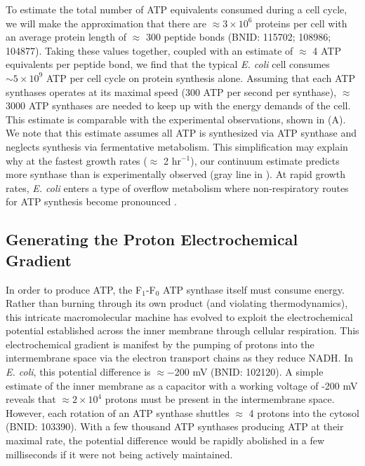 To estimate the total number of ATP equivalents consumed during a cell cycle, we
will make the approximation that there are $\approx 3\times10^6$ proteins per
cell with an average protein length of $\approx$ 300 peptide bonds (BNID:
115702; 108986; 104877). Taking these values together, coupled with an estimate
of $\approx$ 4 ATP equivalents per peptide bond, we find that the typical
\textit{E. coli} cell consumes $\sim 5 \times 10^9$ ATP per cell cycle on
protein synthesis alone. Assuming that each ATP synthases operates at its
maximal speed (300 ATP per second per synthase), $\approx$ 3000 ATP synthases
are needed to keep up with the energy demands of the cell. This estimate
is comparable with the experimental observations,  shown in
 (A). We note that this estimate assumes all ATP is
synthesized via ATP synthase and neglects synthesis via fermentative metabolism.
This simplification may explain why at the fastest growth rates ($\approx$ 2
hr$^{-1}$), our continuum estimate predicts more synthase than is experimentally
observed (gray line in ). At rapid growth rates,
\textit{E. coli} enters a type of overflow metabolism where non-respiratory 
routes for ATP synthesis become pronounced \citep{molenaar2009, zhuang2011, szenk2017}.

\subsection{Generating the Proton Electrochemical Gradient}
In order to produce ATP, the F$_1$-F$_0$ ATP synthase itself must consume
energy. Rather than burning through its own product (and violating
thermodynamics), this intricate macromolecular machine has evolved to exploit
the electrochemical potential established across the inner membrane through
cellular respiration. This electrochemical gradient is manifest by the pumping
of protons into the intermembrane space via the electron transport chains as
they reduce NADH. In \textit{E. coli}, this potential difference is $\approx
-$200 mV (BNID: 102120). A simple estimate of the inner membrane as a capacitor
with a working voltage of -200 mV reveals that $\approx 2\times 10^4$ protons
must be present in the intermembrane space. However, each rotation of an ATP
synthase shuttles $\approx$ 4 protons into the cytosol (BNID: 103390). With a few thousand ATP
synthases producing ATP at their maximal rate, the potential difference would be
rapidly abolished in a few milliseconds if it were not being actively
maintained.

